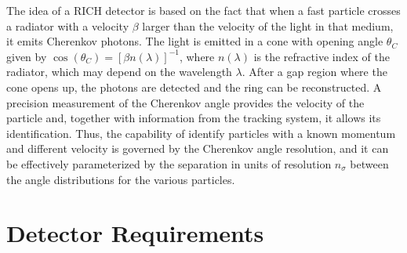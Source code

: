 \documentclass[5p,times,twocolumn]{elsarticle}
\begin{document}
The idea of a RICH detector is based on the fact that when a fast particle crosses a radiator with a velocity $\beta$
larger than the velocity of the light in that medium, it emits Cherenkov photons. The light is emitted in a cone with
opening angle $\theta_C$ given by $\cos(\theta_C)=[\beta n(\lambda)]^{-1}$, where $n(\lambda)$ is the refractive index
of the radiator, which may depend on the wavelength $\lambda$. After a gap region where the cone opens up, the
photons are detected and the ring can be reconstructed. A precision measurement of the Cherenkov angle provides
the velocity of the particle and, together with information from the tracking system, it allows its identification. Thus,
the capability of identify particles with a known momentum and different velocity is governed by the Cherenkov angle
resolution, and it can be effectively parameterized by the separation in units of resolution $n_{\sigma}$ between the
angle distributions for the various particles.

\section{Detector Requirements}
\end{document}
